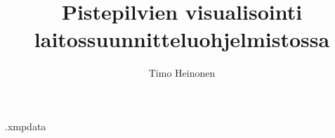 \begin{filecontents*}{\jobname.xmpdata}
\end{filecontents*}
\documentclass{wihuri}
\usepackage[utf8]{inputenc} %
\usepackage[T1]{fontenc}      %
\usepackage[finnish]{babel} %
\usepackage{tytiivis} %
\usepackage{graphicx}%
\usepackage{xcolor}
\usepackage{lastpage}
\usepackage{subfiles}
\usepackage{url}
\usepackage{tikz}
\usepackage{tikz-3dplot}
\usepackage{forest}
\usepackage[a-1b]{pdfx}  %
\usepackage[pdfa]{hyperref} %
\usepackage{times}


%
\newcommand{\mathbi}[1]{\textbf{\em #1}}
\newcommand{\der}{\mbox{d}}
%

\newcommand{\engl}[1]{\emph{(engl. #1)}}



\title{Pistepilvien visualisointi laitossuunnitteluohjelmistossa}
\author{Timo Heinonen}
\maketitle
\newpage
\thispagestyle{empty}
\vspace*{10cm}

\vfill

\hspace*{-2cm}\parbox{\textwidth}{Turun yliopiston laatujärjestelmän mukaisesti
  tämän julkaisun alkuperäisyys on tarkastettu Turnitin
  OriginalityCheck-järjestelmällä} 


